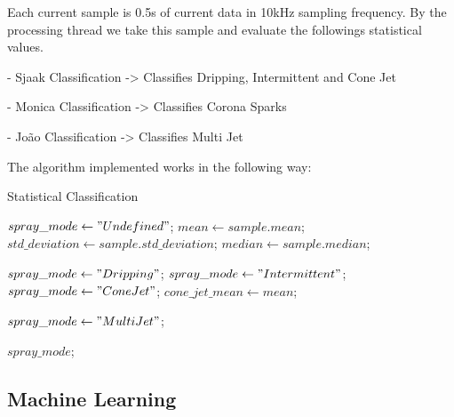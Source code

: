  Each current sample is 0.5s of current data in 10kHz sampling frequency.
 By the processing thread we take this sample and evaluate the followings statistical values.
        
        - Sjaak Classification -> Classifies Dripping, Intermittent and Cone Jet
        
        - Monica Classification -> Classifies Corona Sparks

        - João Classification -> Classifies Multi Jet

	The algorithm implemented works in the following way:
	\begin{algorithm}
        \caption{Statistical Classification}\label{alg:statistical_class}
        \begin{algorithmic}

            \State $spray\_mode \gets "Undefined"$;
            \State $mean \gets sample.mean$; 
            \State $std\_deviation \gets sample.std\_deviation$;
            \State $median \gets sample.median$;
            
                \State $spray\_mode \gets "Dripping"$;
                \State $spray\_ mode \gets "Intermittent"$;
                \State $spray\_ mode \gets "Cone Jet"$;
                \State $cone\_jet\_mean \gets mean$;
            \EndIf

            \EndIf

                    \State $spray\_ mode \gets "Multi Jet"$;
                \EndIf
            \EndIf

            \Return $spray\_ mode$;
        \EndFunction
        \end{algorithmic}
    \end{algorithm}


\subsection{Machine Learning}


